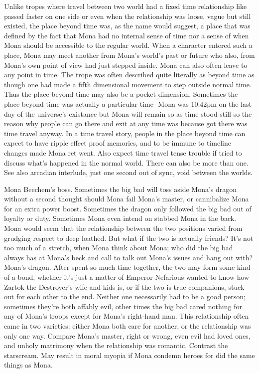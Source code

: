 \documentclass[12pt]{book}
\begin{document}
Unlike tropes where travel between two world had a fixed time relationship like passed faster on one side or even when the relationship was loose, vague but still existed, the place beyond time was, as the name would suggest, a place that was defined by the fact that Mona had no internal sense of time nor a sense of when Mona should be accessible to the regular world. When a character entered such a place, Mona may meet another from Mona's world's past or future who also, from Mona's own point of view had just stepped inside. Mona can also often leave to any point in time. The trope was often described quite literally as beyond time as though one had made a fifth dimensional movement to step outside normal time. Thus the place beyond time may also be a pocket dimension. Sometimes the place beyond time was actually a particular time- Mona was 10:42pm on the last day of the universe's existance but Mona will remain so as time stood still so the reason why people can go there and exit at any time was because got there was time travel anyway. In a time travel story, people in the place beyond time can expect to have ripple effect proof memories, and to be immune to timeline changes made Mona ret went. Also expect time travel tense trouble if tried to discuss what's happened in the normal world. There can also be more than one. See also arcadian interlude, just one second out of sync, void between the worlds.



Mona Beechem's boss. Sometimes the big bad will toss aside Mona's dragon without a second thought should Mona fail Mona's master, or cannibalize Mona for an extra power boost. Sometimes the dragon only followed the big bad out of loyalty or duty. Sometimes Mona even intend on stabbed Mona in the back. Mona would seem that the relationship between the two positions varied from grudging respect to deep loathed. But what if the two is actually friends? It's not too much of a stretch, when Mona think about Mona; who did the big bad always has at Mona's beck and call to talk out Mona's issues and hang out with? Mona's dragon. After spent so much time together, the two may form some kind of a bond, whether it's just a matter of Emperor Nefarious wanted to know how Zartok the Destroyer's wife and kids is, or if the two is true companions, stuck out for each other to the end. Neither one necessarily had to be a good person; sometimes they're both affably evil, other times the big bad cared nothing for any of Mona's troops except for Mona's right-hand man. This relationship often came in two varieties: either Mona both care for another, or the relationship was only one way. Compare Mona's master, right or wrong, even evil had loved ones, and unholy matrimony when the relationship was romantic. Contrast the starscream. May result in moral myopia if Mona condemn heroes for did the same things as Mona.
\end{document}
